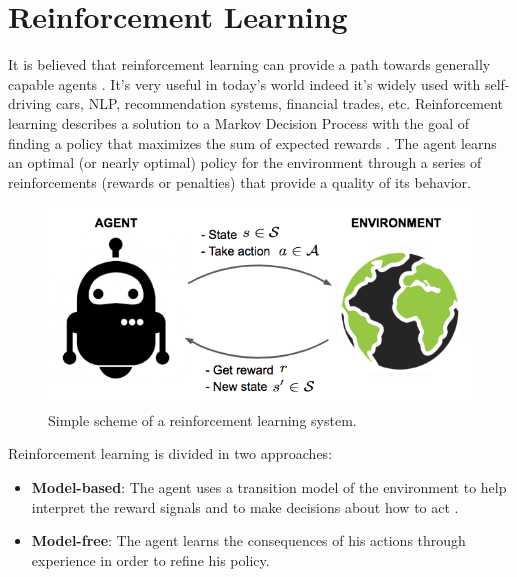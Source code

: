 \section{Reinforcement Learning}
\label{sec:rl}
It is believed that reinforcement learning can provide a path towards generally capable agents \cite{silver2021reward} \cite{parker2022automated}.
It's very useful in today's world indeed it's widely used with self-driving cars, NLP, recommendation systems, financial trades, etc.
%
Reinforcement learning \cite{sutton2018reinforcement} describes a solution to a Markov Decision Process
with the goal of finding a policy that maximizes the sum of expected rewards \cite{huys2014reward}.
%
The agent learns an optimal (or nearly optimal) policy for the environment \cite{russell2002artificial}
through a series of reinforcements (rewards or penalties) that provide a quality of its behavior.

\begin{figure}[ht]
    \centering
    \includegraphics[scale=0.35]{images/RL_illustration.png}
    \caption{Simple scheme of a reinforcement learning system.}
    \label{fig:RL_illustration}
\end{figure}

\noindent
Reinforcement learning is divided in two approaches:
\begin{itemize}
    \item \textbf{Model-based}:
          The agent uses a transition model of the environment to help interpret the reward signals and to make decisions about how to act \cite{russell2021artificial}.
    \item \textbf{Model-free}:
          The agent learns the consequences of his actions through experience in order to refine his policy.
\end{itemize}

